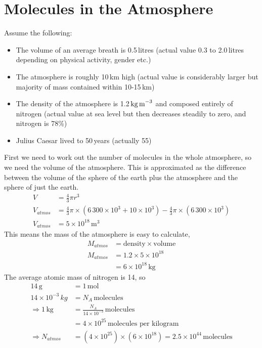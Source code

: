 \section{Molecules in the Atmosphere}
Assume the following:
\begin{itemize}
	\item The volume of an average breath is 0.5\,litres (actual value 0.3 to 2.0\,litres depending on physical activity, gender etc.)
	\item The atmosphere is roughly 10\,km high (actual value is considerably larger but majority of mass contained within 10-15\,km)
	\item The density of the atmosphere is 1.2\,$\text{kg\,m}^{-3}$ and composed entirely of nitrogen (actual value at sea level but then decreases steadily to zero, and nitrogen is 78\%)
	\item Julius Caesar lived to 50\,years (actually 55)
\end{itemize}
First we need to work out the number of molecules in the whole atmosphere, so we need the volume of the atmosphere. This is approximated as the difference between the volume of the sphere of the earth plus the atmosphere and the sphere of just the earth.
\begin{align*}
	V &= \frac{4}{3}\pi r^3 \\
	V_{atmos} &= \frac{4}{3}\pi \times (6\,300\times10^3 + 10\times10^3) - \frac{4}{3}\pi \times (6\,300\times10^3) \\
	V_{atmos} &= 5\times10^{18}\,\text{m}^3
\end{align*}
This means the mass of the atmosphere is easy to calculate,
\begin{align*}
	M_{atmos} &= \text{density} \times \text{volume} \\
	M_{atmos} &= 1.2 \times 5\times10^{18} \\
	&= 6\times10^{18}\,\text{kg} 
\end{align*}
The average atomic mass of nitrogen is 14, so
\begin{align*}
	14\,\text{g} &= 1\,\text{mol} \\
	14\times10^{-3}\,kg &= N_A\, \text{molecules} \\
	\Rightarrow 1\,\text{kg} &= \frac{N_A}{14\times10^{-3}}\, \text{molecules} \\
	&= 4\times10^{25}\, \text{molecules per kilogram} \\
	\Rightarrow N_{atmos} &= (4\times10^{25}) \times (6\times10^{18}) = 2.5\times10^{44}\, \text{molecules}
\end{align*}
